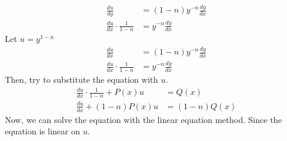 \begin{equation}
  \begin{aligned}
    \frac{du}{dy}&=(1-n){y^{-n}}\frac{dy}{dx} \\
    \frac{du}{dx} \cdot \frac{1}{1-n}&=y^{-n}\frac{dy}{dx}
  \end{aligned}
\end{equation}
Let $u = y^{1-n}$
\begin{equation}
  \begin{aligned}
    \frac{du}{dx} &= (1-n)y^{-n}\frac{dy}{dx} \\
    \frac{du}{dx} \cdot \frac{1}{1-n} &= y^{-n} \frac{dy}{dx}
  \end{aligned}
\end{equation}
Then, try to substitute the equation with $u$.
\begin{equation}
  \begin{aligned}
    \frac{du}{dx} \cdot \frac{1}{1-n} + P(x)u &= Q(x) \\
    \frac{du}{dx} + (1-n)P(x)u &= (1-n)Q(x)
  \end{aligned}
\end{equation}
Now, we can solve the equation with the linear equation method. Since the equation is linear on $u$.